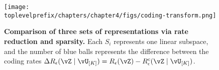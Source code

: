 \documentclass[../../book-main.tex]{subfiles}
\begin{document}


\begin{figure}[t!]
     \centering
         \texttt{[image: \\toplevelprefix/chapters/chapter4/figs/coding-transform.png]}
     \caption{ \small\textbf{Comparison of three sets of  representations via rate reduction and sparsity.} Each $S_i$ represents one linear subspace, and the number of blue balls represents the difference between the coding rates $\Delta R_{\epsilon}(\vZ \mid \vU_{[K]}) = R_\epsilon(\vZ) - R^c_\epsilon(\vZ \mid \vU_{[K]})$. 
     }
        \label{fig:sparse-rate-reduction-diagram}
\end{figure}
\end{document}
